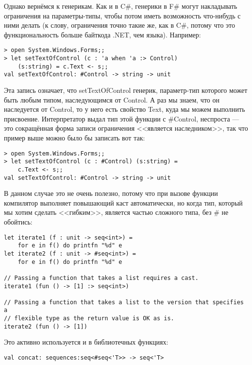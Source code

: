 \documentclass{../../text-style}
\begin{document}
Однако вернёмся к генерикам. Как и в C\#, генерики в F\# могут накладывать ограничения на параметры-типы, чтобы потом иметь возможность что-нибудь с ними делать (к слову, ограничения точно такие же, как в C\#, потому что это функциональность больше байткода .NET, чем языка). Например:

\begin{verbatim}
> open System.Windows.Forms;;
> let setTextOfControl (c : 'a when 'a :> Control) 
    (s:string) = c.Text <- s;;
val setTextOfControl: #Control -> string -> unit
\end{verbatim}

Эта запись означает, что setTextOfControl генерик, параметр-тип которого может быть любым типом, наследующимся от Control. А раз мы знаем, что он наследуется от Control, то у него есть свойство Text, куда мы можем выполнить присвоение. Интерпретатор выдал тип этой функции с \#Control, неспроста --- это сокращённая форма записи ограничения <<является наследником>>, так что пример выше можно было бы записать вот так: 

\begin{verbatim}
> open System.Windows.Forms;;
> let setTextOfControl (c : #Control) (s:string) = 
    c.Text <- s;;
val setTextOfControl: #Control -> string -> unit
\end{verbatim}

В данном случае это не очень полезно, потому что при вызове функции компилятор выполняет повышающий каст автоматически, но когда тип, который мы хотим сделать <<гибким>>, является частью сложного типа, без \# не обойтись:

\begin{verbatim}
let iterate1 (f : unit -> seq<int>) =
    for e in f() do printfn "%d" e
let iterate2 (f : unit -> #seq<int>) =
    for e in f() do printfn "%d" e

// Passing a function that takes a list requires a cast.
iterate1 (fun () -> [1] :> seq<int>)

// Passing a function that takes a list to the version that specifies a
// flexible type as the return value is OK as is.
iterate2 (fun () -> [1])
\end{verbatim}

Это активно используется и в библиотечных функциях:

\begin{verbatim}
val concat: sequences:seq<#seq<'T>> -> seq<'T>
\end{verbatim}
\end{document}
